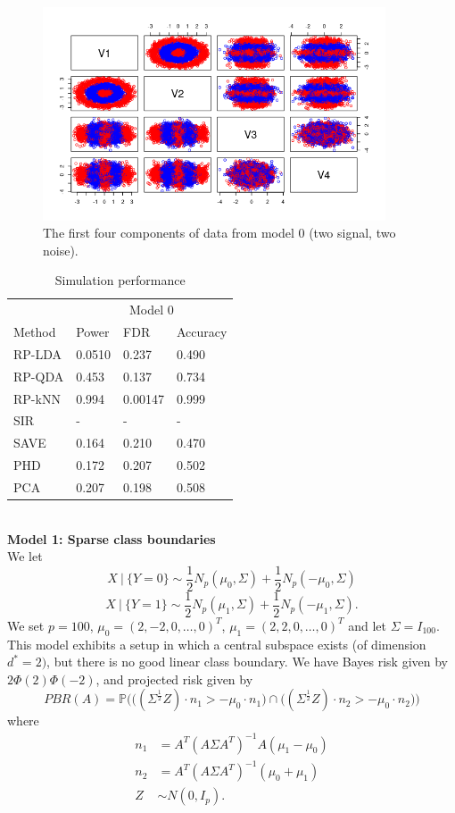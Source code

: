 \documentclass[12pt]{article}
\begin{document}
\begin{figure}[htbp]
    \centering
    \includegraphics[width=4in]{../results/figures/doughnuts.png}
    \caption{The first four components of data from model 0 (two signal, two noise).\label{fig:doughnuts}}
\end{figure}

\begin{table}
  \caption{Simulation performance}
  \label{sample-table}
  \centering
  \begin{tabular}{l|lll}
    \toprule
    & \multicolumn{3}{c}{Model 0}                  \\
    \cmidrule(r){1-4}
    Method     & Power     & FDR & Accuracy  \\
   
    \cmidrule(r){1-4}
    RP-LDA & 0.0510 & 0.237  &   0.490\\
    RP-QDA & 0.453 & 0.137 &  0.734 \\
    RP-kNN & 0.994  & 0.00147 & 0.999\\
    SIR & - &  - &  -  \\
    SAVE & 0.164 & 0.210 & 0.470 \\
    PHD & 0.172 & 0.207 &     0.502 \\
    PCA & 0.207 & 0.198 & 0.508 \\
    \bottomrule
  \end{tabular}
\end{table}

~\\

\noindent\textbf{Model 1: Sparse class boundaries}\\
We let 
\[X \ | \ \{Y = 0\} \sim \frac{1}{2}N_p(\mu_0, \Sigma) + \frac{1}{2}N_p(-\mu_0, \Sigma) \]
\[X \ | \ \{ Y = 1\} \sim \frac{1}{2}N_p(\mu_1, \Sigma) + \frac{1}{2}N_p(-\mu_1, \Sigma). \]
We set $p=100$, $\mu_0 = (2, -2, 0, \ldots, 0)^T$, $\mu_1 = (2, 2, 0, \ldots, 0)^T$ and let $\Sigma = I_{100}$. This model exhibits a setup in which a central subspace exists (of dimension $d^* = 2)$, but there is no good linear class boundary. We have Bayes risk given by $2\Phi(2)\Phi(-2)$, and projected risk given by 
\[ PBR(A) = \mathbb{P}\Big( \big((\Sigma^{\frac{1}{2}}Z) \cdot n_1 > - \mu_0 \cdot n_1 \big)  \cap \big( (\Sigma^{\frac{1}{2}}Z) \cdot n_2 > - \mu_0 \cdot n_2 \big) \Big) \]
where 
\begin{align*}
    n_1 & = A^T(A\Sigma A^T)^{-1}A(\mu_1 - \mu_0) \\
    n_2 & = A^T(A \Sigma A^T)^{-1} (\mu_0 + \mu_1) \\
    Z & \sim N(0, I_p).
\end{align*}
\end{document}
